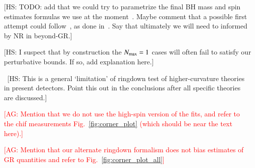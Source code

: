 \documentclass[twocolumn,
               prd,
               aps,
               superscriptaddress,
               tightenlines,
               nofootinbib,
               eqsecnum,
               amsfonts,
               amsmath,
               longbibliography]{revtex4-1}
\newcommand{\agcomm}[1]{{\textcolor{red}{{[AG: #1]}}}}
\newcommand{\hscomm}[1]{{\textcolor{TealBlue}{{[HS: #1]}}}}
\begin{document}
\hscomm{TODO: add that we could try to parametrize the final BH mass and spin estimates formulas we
use at the moment~\cite{Hofmann:2016yih}. Maybe comment that a possible first attempt could follow~\cite{Buonanno:2007sv},
as done in~\cite{Jai-akson:2017ldo,Li:2020wse}. Say that ultimately we will need to informed by NR in beyond-GR.}

\hscomm{I suspect that by construction the $N_{\rm max} = 1$ cases will often fail to satisfy our
perturbative bounds. If so, add explanation here.}

~\hscomm{This is a general `limitation' of ringdown test of higher-curvature theories in present detectors.
Point this out in the conclusions after all specific theories are discussed.}

\agcomm{Mention that we do not use the high-spin version of the fits, and refer to the
chif measurements Fig.~\ref{fig:corner_plot} (which should be near the text here).}

\agcomm{Mention that our alternate ringdown formalism does not bias estimates of GR quantities
and refer to Fig.~\ref{fig:corner_plot_all}}
\end{document}
